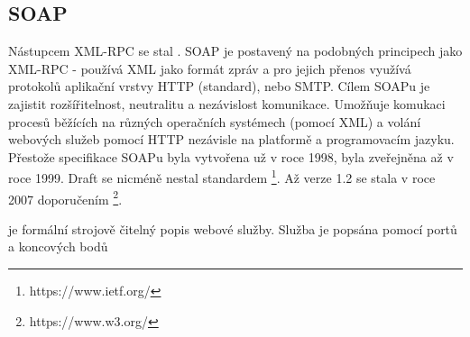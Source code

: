 \subsection{SOAP}
Nástupcem XML-RPC se stal . SOAP je postavený na podobných principech jako XML-RPC - používá XML jako formát zpráv a pro jejich přenos využívá protokolů aplikační vrstvy HTTP (standard), nebo SMTP. Cílem SOAPu je zajistit rozšířitelnost, neutralitu a nezávislost komunikace. Umožňuje komukaci procesů běžících na různých operačních systémech (pomocí XML) a volání webových služeb pomocí HTTP nezávisle na platformě a programovacím jazyku. 
Přestože specifikace SOAPu byla vytvořena už v roce 1998, byla zveřejněna až v roce 1999. Draft se nicméně nestal standardem \footnote{https://www.ietf.org/}.\cite{Box01} Až verze 1.2 se stala v roce 2007 doporučením \footnote{https://www.w3.org/}.\cite{W3C07}

 je formální strojově čitelný popis webové služby. Služba je popsána pomocí portů a koncových bodů


